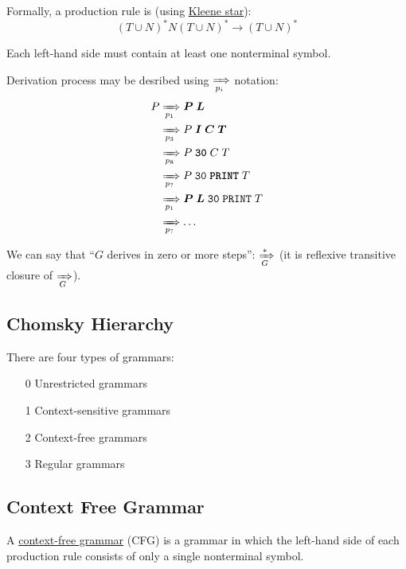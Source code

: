 \documentclass[sigsoft,12pt,nonacm]{acmart}
\renewcommand\emph[1]{\ul{#1}}
\begin{document}
Formally, a production rule is (using \emph{Kleene star}):
\begin{equation*}
(T \cup N)^* N (T \cup N)^* \to (T \cup N)^*
\end{equation*}

Each left-hand side must contain at least one nonterminal symbol.

Derivation process may be desribed using $\xRightarrow[p_i]{}$ notation:
\begin{equation*}
\begin{split}
P &\xRightarrow[p_1]{} \bm{P} \; \bm{L} \\
  &\xRightarrow[p_3]{} P \; \bm{I} \; \bm{C} \; \bm{T} \\
  &\xRightarrow[p_8]{} P \; \textbf{\texttt{30}} \; C \; T \\
  &\xRightarrow[p_?]{} P \; \texttt{30} \; \textbf{\texttt{PRINT}} \; T \\
  &\xRightarrow[p_1]{} \bm{P} \; \bm{L} \; \texttt{30} \; \texttt{PRINT} \; T \\
  &\xRightarrow[p_?]{} \dots \\
\end{split}
\end{equation*}

We can say that ``$G$ derives in zero or more steps'': $\xRightarrow[G]{*}$
(it is reflexive transitive closure of $\xRightarrow[G]{}$).

\subsection{Chomsky Hierarchy}

There are four types of grammars:
\begin{enumerate}
  \item[0] Unrestricted grammars
  \item[1] Context-sensitive grammars
  \item[2] Context-free grammars
  \item[3] Regular grammars
\end{enumerate}

\subsection{Context Free Grammar}

A \emph{context-free grammar} (CFG) is a grammar in which the left-hand side of each production rule consists of only a single nonterminal symbol.
\end{document}
